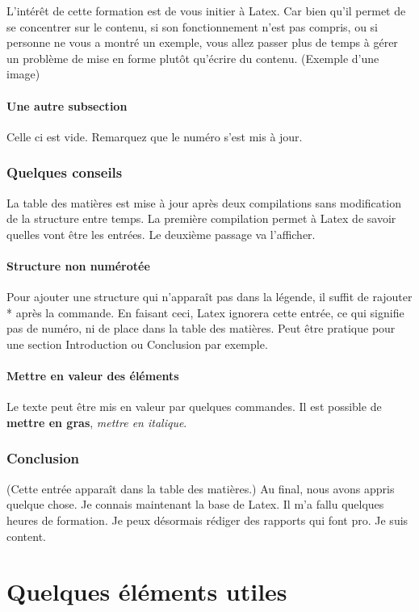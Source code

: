 \documentclass[10pt,a4paper]{report} %
\begin{document}
L'intérêt de cette formation est de vous initier à Latex. Car bien qu'il permet de se concentrer sur le contenu, si son fonctionnement n'est pas compris, ou si personne ne vous a montré un exemple, vous allez passer plus de temps à gérer un problème de mise en forme plutôt qu'écrire du contenu. (Exemple d'une image)

\subsection{Une autre subsection}
Celle ci est vide. Remarquez que le numéro s'est mis à jour.
\section{Quelques conseils}
La table des matières est mise à jour après deux compilations sans modification de la structure entre temps. La première compilation permet à Latex de savoir quelles vont être les entrées. Le deuxième passage va l'afficher.
\subsection*{Structure non numérotée}
Pour ajouter une structure qui n'apparaît pas dans la légende, il suffit de rajouter * après la commande. En faisant ceci, Latex ignorera cette entrée, ce qui signifie pas de numéro, ni de place dans la table des matières. Peut être pratique pour une section Introduction ou Conclusion par exemple.

\subsection{Mettre en valeur des éléments}
Le texte peut être mis en valeur par quelques commandes. Il est possible de \textbf{mettre en gras}, \emph{mettre en italique}.

\section*{Conclusion}
(Cette entrée apparaît dans la table des matières.)
Au final, nous avons appris quelque chose. Je connais maintenant la base de Latex. Il m'a fallu quelques heures de formation. Je peux désormais rédiger des rapports qui font pro. Je suis content.

\part{Quelques éléments utiles}
\end{document}
